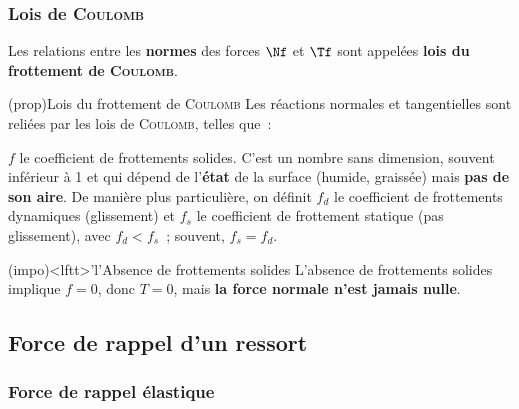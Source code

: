 \documentclass[../../main/main.tex]{subfiles}
\begin{document}
\subsubsection{Lois de \textsc{Coulomb}}
Les relations entre les \textbf{normes} des forces $\Nf$ et $\Tf$ sont appelées
\textbf{lois du frottement de \textsc{Coulomb}}.

\begin{tcb*}(prop){Lois du frottement de \textsc{Coulomb}}
	Les réactions normales et tangentielles sont reliées par les lois de
	\textsc{Coulomb}, telles que~:
	\smallbreak
	\begin{isd}
		\psw{%
			\[
				\norm{\Tf} = f\norm{\Nf}
				\qou
				\norm{\Tf} = f_d \norm{\Nf}
			\]
		}
		\tcblower
	\end{isd}
	$f$ le coefficient de frottements solides. C'est un nombre sans
	dimension, souvent inférieur à 1 et qui dépend de l'\textbf{état} de la
	surface (humide, graissée) mais \textbf{pas de son aire}.
	\bigbreak
	De manière plus particulière, on définit $f_d$ le coefficient de frottements
	dynamiques (glissement) et $f_s$ le coefficient de frottement statique (pas
	glissement), avec $f_d < f_s$~; souvent, $f_s = f_d$.
\end{tcb*}

\begin{tcb*}(impo)<lftt>'l'{Absence de frottements solides}
	L'absence de frottements solides implique $f=0$, donc $T = 0$, mais
	\textbf{la force normale n'est jamais nulle}.
\end{tcb*}

\subsection{Force de rappel d'un ressort}
\subsubsection{Force de rappel élastique}
\end{document}
